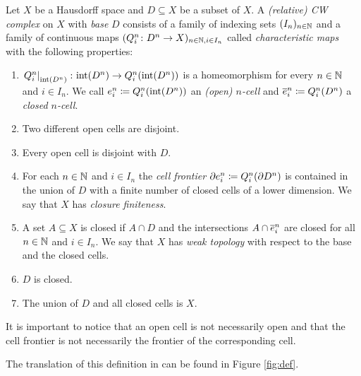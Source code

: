 \begin{defi}\label{def:cwcomplex}
    Let $X$ be a Hausdorff space and $D \subseteq X$ be a subset of $X$. 
    A \emph{(relative) CW complex} on $X$ with \emph{base} $D$ consists of a family of indexing sets $(I_n)_{n \in \bN}$ and a family of continuous maps $(Q_i^n \colon D^n \to X)_{n \in \bN, i \in I_n}$ called \emph{characteristic maps} with the following properties: 
    \begin{enumerate}
        \item $\restrict{Q_i^n}{\interior{D^n}} \colon \interior{D^n} \to Q_i^n(\interior{D^n})$ is a homeomorphism for every $n \in \bN$ and $i \in I_n$. We call $\openCell{n}{i} \coloneq Q_i^n(\interior{D^n})$ an \emph{(open) $n$-cell} and $\closedCell{n}{i} \coloneq Q_i^n(D^n)$ a \emph{closed $n$-cell}.
        \item Two different open cells are disjoint.
        \item Every open cell is disjoint with $D$.
        \item For each $n \in \bN$ and $i \in I_n$ the \emph{cell frontier} $\cellFrontier{n}{i} \coloneq Q_i^n(\boundary D^n)$ is contained in the union of $D$ with a finite number of closed cells of a lower dimension. We say that $X$ has \emph{closure finiteness}.
        \item A set $A \subseteq X$ is closed if $A \cap D$ and the intersections $A \cap \closedCell{n}{i}$ are closed for all $n \in \bN$ and $i \in I_n$. We say that $X$ has \emph{weak topology} with respect to the base and the closed cells. 
        \item $D$ is closed. 
        \item The union of $D$ and all closed cells is $X$.
    \end{enumerate}
\end{defi}

It is important to notice that an open cell is not necessarily open and that the cell frontier is not necessarily the frontier of the corresponding cell.

The translation of this definition in \mathlib can be found in Figure \ref{fig:def}.


